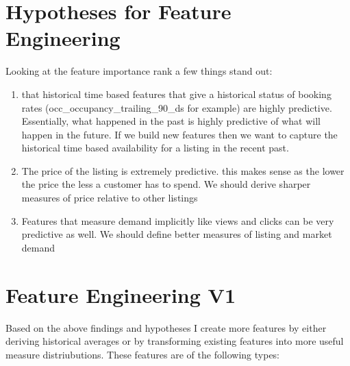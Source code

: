 \documentclass[11pt]{article}
\begin{document}
    \section{Hypotheses for Feature
Engineering}\label{hypotheses-for-feature-engineering}

Looking at the feature importance rank a few things stand out:

\begin{enumerate}
\def\labelenumi{\arabic{enumi})}
\item
  that historical time based features that give a historical status of
  booking rates (occ\_occupancy\_trailing\_90\_ds for example) are
  highly predictive. Essentially, what happened in the past is highly
  predictive of what will happen in the future. If we build new features
  then we want to capture the historical time based availability for a
  listing in the recent past.
\item
  The price of the listing is extremely predictive. this makes sense as
  the lower the price the less a customer has to spend. We should derive
  sharper measures of price relative to other listings
\item
  Features that measure demand implicitly like views and clicks can be
  very predictive as well. We should define better measures of listing
  and market demand
\end{enumerate}

    \section{Feature Engineering V1}\label{feature-engineering-v1}

Based on the above findings and hypotheses I create more features by
either deriving historical averages or by transforming existing features
into more useful measure distriubutions. These features are of the
following types:
\end{document}
